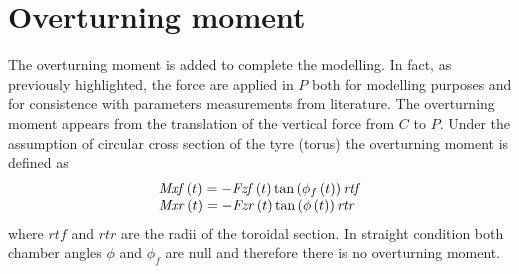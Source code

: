 \section{Overturning moment}
%
The overturning moment is added to complete the modelling. In fact, as previously highlighted, the force are applied in $P$ both for modelling purposes and for consistence with parameters measurements from literature\cite{pacejka2012tire,sharp2014method}. The overturning moment appears from the translation of the vertical force from $C$ to $P$. Under the assumption of circular cross section of the tyre (torus) the overturning moment is defined as
%
\begin{equation}
    \begin{array}{l} {\it Mxf} \left( t \right) =-{\it Fzf}
    \left( t \right) \tan \left( \phi_{f} \left( t \right)  \right) {\it 
   rtf}\\ {\it Mxr} \left( t \right) =-{\it Fzr}
    \left( t \right) \tan \left( \phi \left( t \right)  \right) {\it rtr}
   \end{array}  
\end{equation}
%
where $rtf$ and $rtr$ are the radii of the toroidal section. In straight condition both chamber angles $\phi$ and $\phi_f$ are null and therefore there is no overturning moment. 
%